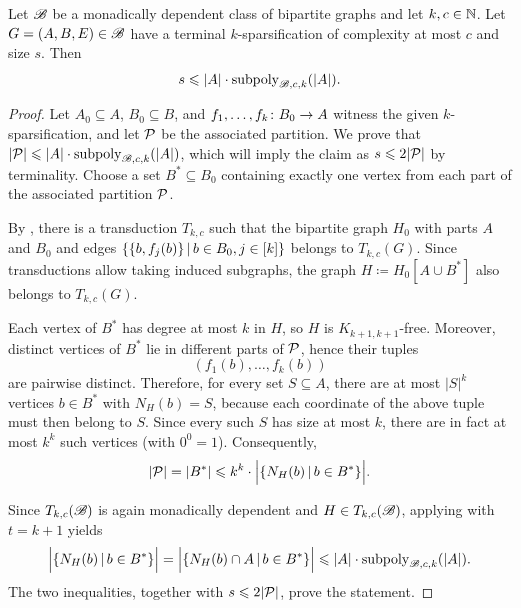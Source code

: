 \begin{lemma}\label{lem:terminal}
  Let $\BB$ be a monadically dependent class of bipartite graphs and let $k,c\in\N$.
  Let $G=(A,B,E)\in\BB$ have a terminal $k$-sparsification of complexity at most $c$ and size $s$.
  Then
  \[
    s\le |A|\cdot \subpoly_{\BB,c,k}(|A|).
  \]
\end{lemma}
\begin{proof}
Let $A_0\subseteq A$, $B_0\subseteq B$, and $f_1,\ldots,f_k\from B_0\to A$
witness the given $k$-sparsification,
and let $\cal P$ be the associated partition. We prove that $|\cal P|\le |A|\cdot \subpoly_{\BB,c,k}(|A|)$, which will imply the claim as $s\le 2|\cal P|$ by terminality.
Choose a set $B^*\subseteq B_0$ containing exactly one vertex from each part of the associated partition
$\cal P$.

By , there is a transduction $T_{k,c}$ such that the
bipartite graph $H_0$ with parts $A$ and $B_0$ and
edges $\setof{\set{b,f_j(b)}}{b\in B_0,j\in[k]}$ 
belongs to $T_{k,c}(G)$.
Since transductions allow taking induced subgraphs, the graph
$H\coloneqq H_0[A\cup B^*]$ also belongs to $T_{k,c}(G)$.

Each vertex of $B^*$ has degree at most $k$ in $H$, so $H$ is
$K_{k+1,k+1}$-free.
Moreover, distinct vertices of $B^*$ lie in different parts of $\cal P$, hence
their tuples
\[
  (f_1(b),\ldots,f_k(b))
\]
are pairwise distinct.
Therefore, for every set $S\subseteq A$, there are at most $|S|^k$ vertices
$b\in B^*$ with $N_H(b)=S$, because each coordinate of the above tuple must
then belong to $S$.
Since every such $S$ has size at most $k$, there are in fact at most
$k^k$ such vertices (with $0^0=1$). Consequently, 
\[
  |\cal P|=|B^*|
  \le k^k\cdot \Big|\setof{N_H(b)}{b\in B^*}\Big|.
\]

Since $T_{k,c}(\BB)$ is again monadically dependent and $H\in T_{k,c}(\BB)$,
applying  with $t=k+1$ yields
\[
  \Big|\setof{N_H(b)}{b\in B^*}\Big|
  =\Big|\setof{N_H(b)\cap A}{b\in B^*}\Big|
  \le |A|\cdot \subpoly_{\BB,c,k}(|A|).
\]
The two inequalities,
together with $s\le 2|\cal P|$,
prove the
statement.
\end{proof}

